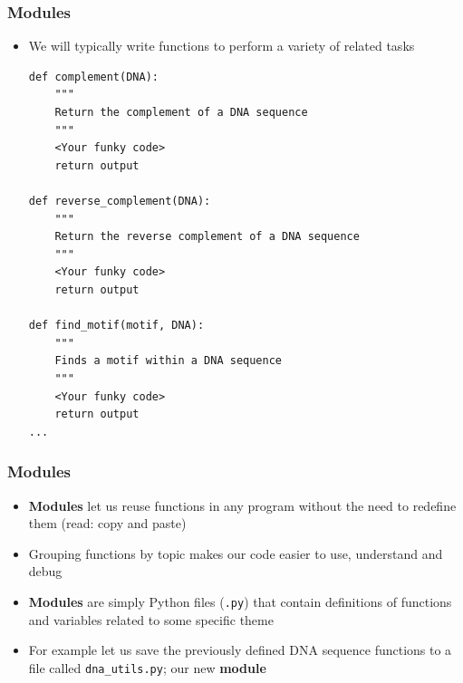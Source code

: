 \documentclass[pdf]{beamer}
\begin{document}
\begin{frame}[fragile]
\frametitle{Modules}

\begin{itemize}
	\item We will typically write functions to perform a variety of related
	tasks

\begin{lstlisting}[style=python]
def complement(DNA):
    """
    Return the complement of a DNA sequence 
    """
    <Your funky code>
    return output

def reverse_complement(DNA):
    """
    Return the reverse complement of a DNA sequence 
    """
    <Your funky code>
    return output 

def find_motif(motif, DNA):
    """
    Finds a motif within a DNA sequence 
    """
    <Your funky code>
    return output 
...
\end{lstlisting}

\end{itemize}
\end{frame}

\begin{frame}[fragile]
\frametitle{Modules}

\begin{itemize}\addtolength{\itemsep}{1.2\baselineskip}
	
	\item<1-> \textbf{Modules} let us reuse functions in any program 
	without the need to redefine them (read: copy and paste)

	\item<2-> Grouping functions by topic makes our code easier to use, understand and debug

	\item<3-> \textbf{Modules} are simply Python files (\texttt{.py}) that contain
	definitions of functions and variables related to some specific theme

	\item<4-> For example let us save the previously defined DNA sequence functions
	to a file called \texttt{dna\_utils.py}; our new \textbf{module}
	 

\end{itemize}
\end{frame}
\end{document}
